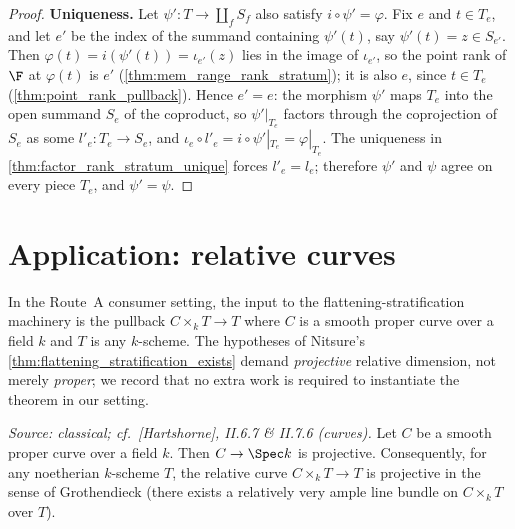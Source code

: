 \begin{proof}
  \textbf{Uniqueness.}  Let \(\psi' : T \to \coprod_f S_f\) also satisfy
  \(i \circ \psi' = \varphi\).  Fix \(e\) and \(t \in T_e\), and let
  \(e'\) be the index of the summand containing \(\psi'(t)\), say
  \(\psi'(t) = z \in S_{e'}\).  Then
  \(\varphi(t) = i(\psi'(t)) = \iota_{e'}(z)\) lies in the image of
  \(\iota_{e'}\), so the point rank of \(\F\) at \(\varphi(t)\) is \(e'\)
  (\cref{thm:mem_range_rank_stratum}); it is also \(e\), since
  \(t \in T_e\) (\cref{thm:point_rank_pullback}).  Hence \(e' = e\): the
  morphism \(\psi'\) maps \(T_e\) into the open summand \(S_e\) of the
  coproduct, so \(\psi'|_{T_e}\) factors through the coprojection of
  \(S_e\) as some \(l'_e : T_e \to S_e\), and
  \(\iota_e \circ l'_e = i \circ \psi'|_{T_e} = \varphi|_{T_e}\).  The
  uniqueness in \cref{thm:factor_rank_stratum_unique} forces
  \(l'_e = l_e\); therefore \(\psi'\) and \(\psi\) agree on every piece
  \(T_e\), and \(\psi' = \psi\).
\end{proof}

\section{Application: relative curves}
\label{sec:flatstrat_curve_application}

In the Route~A consumer setting, the input to the flattening-stratification
machinery is the pullback \(C \times_k T \to T\) where \(C\) is a smooth proper
curve over a field \(k\) and \(T\) is any \(k\)-scheme.  The hypotheses of
Nitsure's \cref{thm:flattening_stratification_exists} demand
\emph{projective} relative dimension, not merely \emph{proper}; we record that
no extra work is required to instantiate the theorem in our setting.

\begin{lemma}
  \label{lem:smooth_proper_curve_projective}
  \textit{Source: classical; cf.\ [Hartshorne], II.6.7 \& II.7.6 (curves).}
  Let \(C\) be a smooth proper curve over a field \(k\).  Then \(C \to \Spec k\) is
  projective.  Consequently, for any noetherian \(k\)-scheme \(T\), the relative
  curve \(C \times_k T \to T\) is projective in the sense of Grothendieck (there
  exists a relatively very ample line bundle on \(C \times_k T\) over \(T\)).
\end{lemma}

